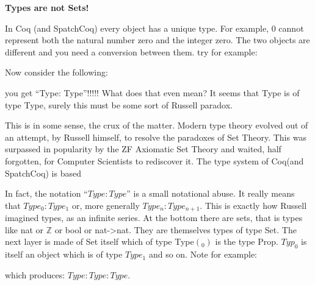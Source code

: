 {\bf \Large Types are not Sets!}

In Coq (and SpatchCoq) every object has a unique type. For example, 0 cannot represent both the natural number zero and the integer zero. The two objects are different and you need a conversion between them. try for example:




Now consider the following:


you get ``Type: Type''!!!!! What does that even mean? It seems that Type is of type Type, surely this must be some sort of Russell paradox.

This is in some sense, the crux of the matter. Modern type theory evolved out of an attempt, 
by Russell himself, to resolve the paradoxes of Set Theory. This was surpassed in popularity by the ZF Axiomatic Set Theory and waited, half forgotten, for Computer Scientists to rediscover it. The type system of Coq(and SpatchCoq) is based 

In fact, the notation ``$Type : Type$'' is a small notational abuse. It really means that $Type_{0} : Type_{1}$ or, more generally $Type_{n} : Type_{n+1}$. This is exactly how Russell imagined types,  as an infinite series. At the bottom there are sets, that is types like nat or $\mathbb{Z}$ or bool or nat->nat. They are themselves types of type Set. The next layer is made of Set itself which of type Type$(_{0})$ is the type Prop. $Typ_{0}$ is itself an object which is of type $Type_{1}$ and so on. Note for example:

 which produces:
$Type : Type
     : Type$.
     

    

     
     